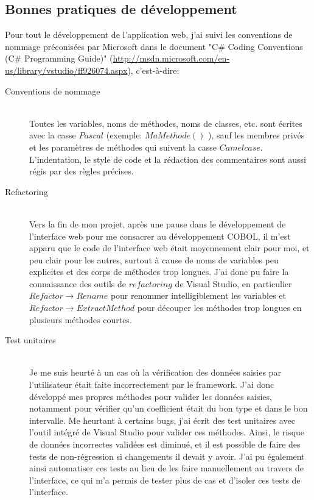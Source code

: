 \documentclass[a4paper,french,8pt]{article}
\begin{document}
	\subsection{Bonnes pratiques de développement}
			Pour tout le développement de l'application web, j'ai suivi les conventions de nommage préconisées par Microsoft dans le document
			"C\# Coding Conventions (C\# Programming Guide)" (\url{http://msdn.microsoft.com/en-us/library/vstudio/ff926074.aspx}), c'est-à-dire:
			\begin{description} 
				\item[Conventions de nommage] \hfill \\
					Toutes les variables, noms de méthodes, noms de classes, etc. sont écrites avec la casse $Pascal$ (exemple: $MaMethode()$ ), sauf les membres privés et les paramètres de méthodes qui suivent
					la casse $Camelcase$.
					L'indentation, le style de code et la rédaction des commentaires sont aussi régis par des règles précises.
				\item[Refactoring] \hfill \\
					Vers la fin de mon projet, après une pause dans le développement de l'interface web pour me consacrer au développement COBOL, il m'est apparu que le code de l'interface web était moyennement clair pour moi, 
					et peu clair pour les autres, surtout à cause de noms de variables peu explicites et des corps de méthodes trop longues.
					J'ai donc pu faire la connaissance des outils de $refactoring$ de Visual Studio, en particulier $Refactor \to Rename$ pour renommer intelligiblement les variables
					et $Refactor \to Extract Method$ pour découper les méthodes trop longues en plusieurs méthodes courtes.
				\item[Test unitaires]  \hfill \\
					Je me suis heurté à un cas où la vérification des données saisies par l'utilisateur était faite incorrectement par le framework. J'ai donc développé mes propres méthodes pour valider les données saisies,
					notamment pour vérifier qu'un coefficient était du bon type et dans le bon intervalle. Me heurtant à certains bugs, j'ai écrit des test unitaires avec l'outil intégré de Visual Studio 
					pour valider ces méthodes. Ainsi, le risque de données incorrectes validées est diminué, et il est possible de faire des tests de non-régression si changements il devait y avoir.
					J'ai pu également ainsi automatiser ces tests au lieu de les faire manuellement au travers de l'interface, ce qui m'a permis de tester plus de cas et d'isoler ces tests de l'interface.
			\end{description}
	
\end{document}
